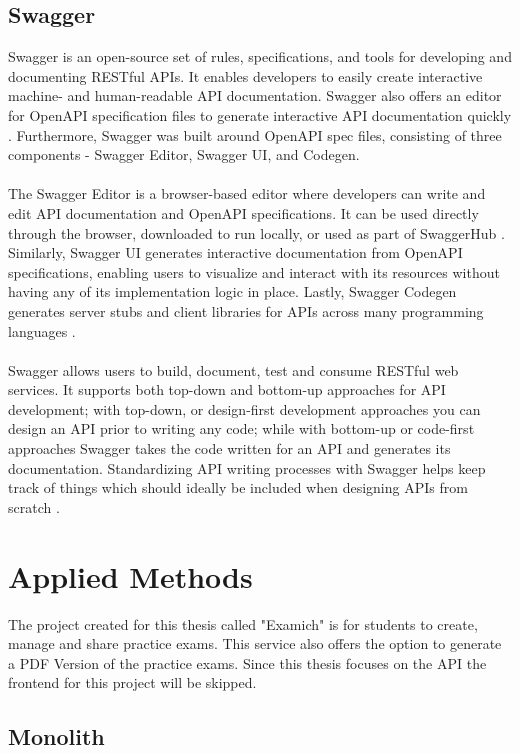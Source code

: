 \documentclass[BIF,Bachelor,nenglish]{twbook}%
\begin{document}
\section{Swagger}
Swagger is an open-source set of rules, specifications, and tools for developing and documenting RESTful APIs. It enables developers to easily create interactive machine- and human-readable API documentation. Swagger also offers an editor for OpenAPI specification files to generate interactive API documentation quickly \cite{javapoint}. Furthermore, Swagger was built around OpenAPI spec files, consisting of three components - Swagger Editor, Swagger UI, and Codegen.
\\
\\
The Swagger Editor is a browser-based editor where developers can write and edit API documentation and OpenAPI specifications. It can be used directly through the browser, downloaded to run locally, or used as part of SwaggerHub \cite{hubspot}. Similarly, Swagger UI generates interactive documentation from OpenAPI specifications, enabling users to visualize and interact with its resources without having any of its implementation logic in place. Lastly, Swagger Codegen generates server stubs and client libraries for APIs across many programming languages \cite{swagger}.
\\
\\
Swagger allows users to build, document, test and consume RESTful web services. It supports both top-down and bottom-up approaches for API development; with top-down, or design-first development approaches you can design an API prior to writing any code; while with bottom-up or code-first approaches Swagger takes the code written for an API and generates its documentation. Standardizing API writing processes with Swagger helps keep track of things which should ideally be included when designing APIs from scratch \cite{scaleyourapp}.


\clearpage
\chapter{Applied Methods}
The project created for this thesis called "Examich" is for students to create, manage and share practice exams. This service also offers the option to generate a PDF Version of the practice exams. Since this thesis focuses on the API the frontend for this project will be skipped.

\section{Monolith}
\end{document}
